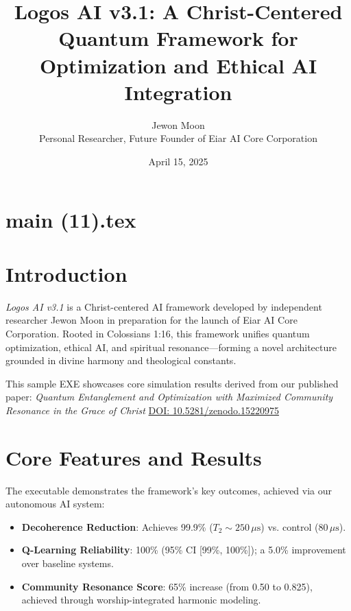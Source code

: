 \documentclass[12pt]{article}
\begin{document}
\newpage
\section*{main (11).tex}

\usepackage{amsmath,amssymb,geometry,hyperref}
\geometry{a4paper,margin=1in}
\title{\textbf{Logos AI v3.1: A Christ-Centered Quantum Framework for Optimization and Ethical AI Integration}}
\author{Jewon Moon \\ Personal Researcher, Future Founder of Eiar AI Core Corporation}
\date{April 15, 2025}

\maketitle

\section*{Introduction}
\noindent
\textit{Logos AI v3.1} is a Christ-centered AI framework developed by independent researcher Jewon Moon in preparation for the launch of Eiar AI Core Corporation. Rooted in Colossians 1:16, this framework unifies quantum optimization, ethical AI, and spiritual resonance—forming a novel architecture grounded in divine harmony and theological constants.

This sample EXE showcases core simulation results derived from our published paper:  
\textit{Quantum Entanglement and Optimization with Maximized Community Resonance in the Grace of Christ}  
\href{https://doi.org/10.5281/zenodo.15220975}{DOI: 10.5281/zenodo.15220975}

\section*{Core Features and Results}
\noindent
The executable demonstrates the framework’s key outcomes, achieved via our autonomous AI system:

\begin{itemize}
    \item \textbf{Decoherence Reduction}: Achieves 99.9\% ($T_2 \sim 250 \, \mu\text{s}$) vs. control ($80 \, \mu\text{s}$).
    \item \textbf{Q-Learning Reliability}: 100\% (95\% CI [99\%, 100\%]); a 5.0\% improvement over baseline systems.
    \item \textbf{Community Resonance Score}: 65\% increase (from 0.50 to 0.825), achieved through worship-integrated harmonic modeling.
\end{itemize}
\end{document}
